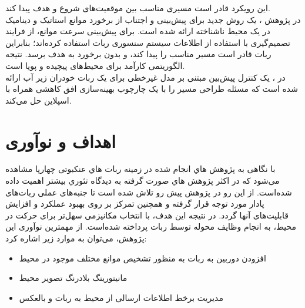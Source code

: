 این رویکرد قادر است مسیری مناسب بین موقعیت‌های شروع و هدف پیدا کند.
\\
در پژوهش
\cite{kamil2017new}
، یک روش جدید برای پیش‌بینی و اجتناب از برخورد موانع استاتیک و دینامیک در یک محیط ناشناخته ارائه شده است. برای پیش‌بینی سرعت موانع، از فرایند تصمیم‌گیری با استفاده از اطلاعات سیستم سنسوری ربات استفاده کرده‌اند؛ بنابراین ربات قادر است مسیر مناسب را پیدا کند، و بدون برخورد به هدف برسد. نتیجه الگوریتمی کارآمد برای محیط‌های پیچیده و پویا است.
\\
در 
\cite{shen2015model}
، یک کنترل پیش‌بین مبتنی بر مدل 
\noindent\unskip{}
غیرخطی برای یک ربات خودران زیر آب ارائه شده است که مسئله طراحی مسیر را  با یک چارچوب بهینه‌سازی افق کاهشی همراه با اسپلاین حل می‌کند.








\section{اهداف و نوآوری}

با نگاهی به پژوهش هاي انجام شده در زمينه ربات هاي عنکبوتی چهارپا مشاهده می‌شود كه در اكثر پژوهش هاي صورت گرفته به ديدگاه تئوري بيشتر اهمیت داده شده‌است. از این رو در پژوهش پيش رو تلاش شده است تا جنبه‌های عملی ربات‌‌های پادار مورد توجه قرار گرفته و همچنین تمرکز بر روی بهبود عملکرد و افزایش قابلیت‌های آنها گردد. در نتیجه این هدف، با انتخاب مکانیزمی سهل‌تر برای حرکت در محیط، به انجام وظایف محوله توسط ربات پرداخته شده‌است.
از مهمترین نوآوری این پژوهش، می‌توان به موارد زیر اشاره کرد:
\begin{itemize}
	\item
	افزودن دوربین به ربات به منظور تشخیص موانع مختلف موجود در محیط
	\item
	مانیتورینگ بلادرنگ
	\noindent\unskip{}
	تصویر محیط
	\item
	مدیریت برخط
	\noindent\unskip{}
	اطلاعات ارسالی از محیط به ربات و بالعکس
\end{itemize}

